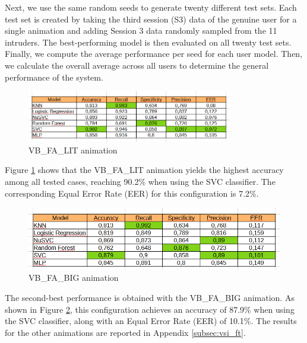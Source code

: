 \documentclass{article}
\begin{document}
Next, we use the same random seeds to generate twenty different test sets. 
Each test set is created by taking the third session (S3) data of the genuine user for a single animation and adding Session 3 data randomly sampled from the 11 intruders.
The best-performing model is then evaluated on all twenty test sets. 
Finally, we compute the average performance per seed for each user model. 
Then, we calculate the overall average across all users to determine the general performance of the system.

\begin{figure}[ht]
    \centering
    \includegraphics[width=0.8\textwidth]{Images/Results/Verification_single_intruders/ft/VB_FA_LIT.png}
    \caption{VB\_FA\_LIT animation}
    \label{fig:VB_FA_LIT_fti}
\end{figure}

Figure \ref{fig:VB_FA_LIT_fti} shows that the VB\_FA\_LIT animation yields the highest accuracy among all tested cases, reaching 90.2\% when using the SVC classifier. 
The corresponding Equal Error Rate (EER) for this configuration is 7.2\%.

\begin{figure}[ht]
    \centering
    \includegraphics[width = 0.8
    \textwidth]{Images/Results/Verification_single_intruders/ft/VB_FA_BIG.png}
    \caption{VB\_FA\_BIG animation}
    \label{fig:VB_FA_BIG_fti}
\end{figure}

The second-best performance is obtained with the VB\_FA\_BIG animation. 
As shown in Figure \ref{fig:VB_FA_BIG_fti}, this configuration achieves an accuracy of 87.9\% when using the SVC classifier, along with an Equal Error Rate (EER) of 10.1\%. 
The results for the other animations are reported in Appendix \ref{subsec:vsi_ft}.
\end{document}
